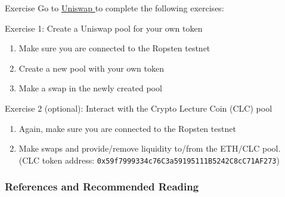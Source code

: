 \documentclass[handout]{beamer}
\begin{document}
\begin{frame}{Exercise}
	Go to \href{https://app.uniswap.org/}{Uniswap \link} to complete the following exercises:
	\vspace{.5cm}

	\begin{exercise}{Exercise 1: Create a Uniswap pool for your own token}
		\begin{enumerate}
			\item Make sure you are connected to the Ropsten testnet
			\item Create a new pool with your own token
			\item Make a swap in the newly created pool
		\end{enumerate}
	\end{exercise}
	\vspace{.5cm}
	
	
	\begin{exercise}{Exercise 2 (optional): Interact with the Crypto Lecture Coin (CLC) pool}
		\begin{enumerate}
			\item Again, make sure you are connected to the Ropsten testnet
			\item Make swaps and provide/remove liquidity to/from the ETH/CLC pool.\\ (CLC token address: \texttt{0x59f7999334c76C3a59195111B5242C8cC71AF273})
		\end{enumerate}
	\end{exercise}
\end{frame}



\begin{frame}%
\frametitle{References and Recommended Reading}
\nocite{FS:21}
		
		
	
\end{frame}
\end{document}
